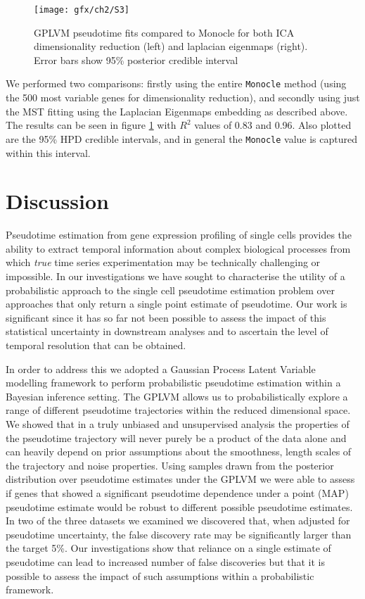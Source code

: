 \begin{figure}
\centering
	\texttt{[image: gfx/ch2/S3]}
\caption[Comparison of GPLVM pseudotime fits.]{GPLVM pseudotime fits compared to Monocle for both ICA dimensionality reduction (left) and laplacian eigenmaps (right). Error bars show 95\% posterior credible interval} \label{fig:s3}
\end{figure}

We performed two comparisons: firstly using the entire \texttt{Monocle} method (using the 500 most variable genes for dimensionality reduction), and secondly using just the MST fitting using the Laplacian Eigenmaps embedding as described above. The results can be seen in figure \ref{fig:s3} with $R^2$ values of 0.83 and 0.96. Also plotted are the 95\% HPD credible intervals, and in general the \texttt{Monocle} value is captured within this interval.


\section{Discussion}

Pseudotime estimation from gene expression profiling of single cells provides the ability to extract temporal information about complex biological processes from which \emph{true} time series experimentation may be technically challenging or impossible. In our investigations we have sought to characterise the utility of a probabilistic approach to the single cell pseudotime estimation problem over approaches that only return a single point estimate of pseudotime. Our work is significant since it has so far not been possible to assess the impact of this statistical uncertainty in downstream analyses and to ascertain the level of temporal resolution that can be obtained.

In order to address this we adopted a Gaussian Process Latent Variable modelling framework to perform probabilistic pseudotime estimation within a Bayesian inference setting. The GPLVM allows us to probabilistically explore a range of different pseudotime trajectories within the reduced dimensional space. We showed that in a truly unbiased and unsupervised analysis the properties of the pseudotime trajectory will never purely be a product of the data alone and can heavily depend on prior assumptions about the smoothness, length scales of the trajectory and noise properties. Using  samples drawn from the posterior distribution over pseudotime estimates under the GPLVM we were able to assess if genes that showed a significant pseudotime dependence under a point (MAP) pseudotime estimate would be robust to different possible pseudotime estimates. In two of the three datasets we examined we discovered that, when adjusted for pseudotime uncertainty, the false discovery rate may be significantly larger than the target 5\%. Our investigations show that reliance on a single estimate of pseudotime can lead to increased number of false discoveries but that it is possible to assess the impact of such assumptions within a probabilistic framework.

